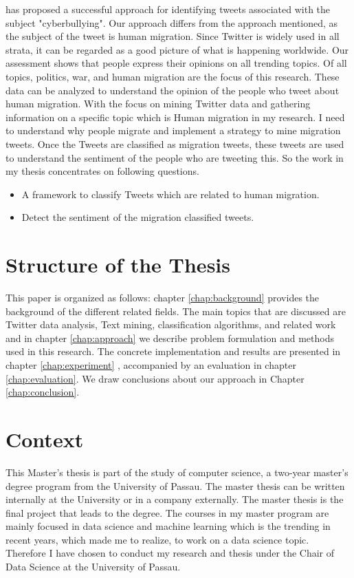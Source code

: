\cite{Cortis} has proposed a successful approach for identifying tweets associated with the subject "cyberbullying". Our approach differs from the approach mentioned, as the subject of the tweet is human migration. Since Twitter is widely used in all strata, it can be regarded as a good picture of what is happening worldwide.  Our assessment shows that people express their opinions on all trending topics. Of all topics, politics, war, and human migration are the focus of this research. These data can be analyzed to understand the opinion of the people who tweet about human migration.  With the focus on mining Twitter data and gathering information on a specific topic which is Human migration in my research. I need to understand why people migrate and implement a strategy to mine migration tweets. Once the Tweets are classified as migration tweets, these tweets are used to understand the sentiment of the people who are tweeting this. So the work in my thesis concentrates on following questions.


  

\begin{itemize}
  \item A framework to classify Tweets which are related to human migration.
  \item Detect the sentiment of the migration classified tweets. 
\end{itemize}

\section{Structure of the Thesis}
This paper is organized as follows: chapter \ref{chap:background}  provides the background of the different related fields.
The main topics that are discussed are Twitter data analysis, Text mining, classification algorithms, and related work and in chapter \ref{chap:approach} we describe problem formulation and methods used in this research. The concrete implementation and results are
presented in chapter \ref{chap:experiment} , accompanied by an evaluation in chapter \ref{chap:evaluation}. We draw
conclusions about our approach in Chapter \ref{chap:conclusion}.

\section{Context}
This Master's thesis is part of the study of computer science, a two-year master's degree program from the University of Passau. The master thesis can be written internally at the University or in a company externally. The master thesis is the final project that leads to the degree. The courses in my master program are mainly focused in data science and machine learning which is the trending in recent years, which made me to realize, to work on a data science topic. Therefore I have chosen to conduct my research and thesis under the Chair of Data Science at the University of Passau. 


